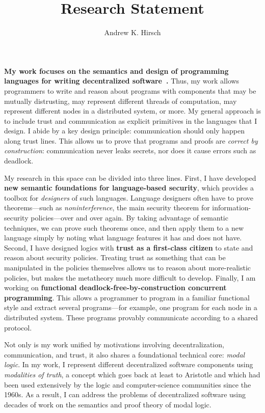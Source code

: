 \documentclass{article}
\author{Andrew K. Hirsch}
\title{Research Statement}
\date{}
\theoremstyle{definition}
\begin{document}
\maketitle

\textbf{My work focuses on the semantics and design of programming languages for writing decentralized software~\citep{SilverHHCZ22,MenzHLG22,HirschG22,HirschC21,HirschACAT20,HirschT18,HirschC13}.}
Thus, my work allows programmers to write and reason about programs with components that may be mutually distrusting, may represent different threads of computation, may represent different nodes in a distributed system, or more.
My general approach is to include trust and communication as explicit primitives in the languages that I design.
I abide by a key design principle: communication should only happen along trust lines.
This allows us to prove that programs and proofs are \emph{correct by construction}: communication never leaks secrets, nor does it cause errors such as deadlock.

My research in this space can be divided into three lines.
First, I have developed \textbf{new semantic foundations for language-based security}, which provides a toolbox for \emph{designers} of such languages.
Language designers often have to prove theorems---such as \emph{noninterference}, the main security theorem for information-security policies---over and over again.
By taking advantage of semantic techniques, we can prove such theorems once, and then apply them to a new language simply by noting what language features it has and does not have.
Second, I have designed logics with \textbf{trust as a first-class citizen} to state and reason about security policies.
Treating trust as something that can be manipulated in the policies themselves allows us to reason about more-realistic policies, but makes the metatheory much more difficult to develop.
Finally, I am working on \textbf{functional deadlock-free-by-construction concurrent programming}.
This allows a programmer to program in a familiar functional style and extract several programs---for example, one program for each node in a distributed system.
These programs provably communicate according to a shared protocol.

Not only is my work unified by motivations involving decentralization, communication, and trust, it also shares a foundational technical core: \emph{modal logic}.
In my work, I represent different decentralized software components using \emph{modalities of truth}, a concept which goes back at least to Aristotle and which had been used extensively by the logic and computer-science communities since the 1960s.
As a result, I can address the problems of decentralized software using decades of work on the semantics and proof theory of modal logic.
\end{document}
